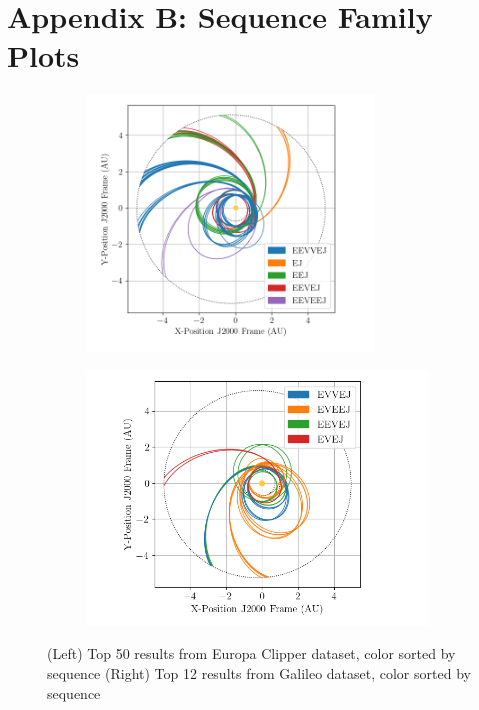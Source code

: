 \documentclass[letterpaper, preprint, paper,11pt]{AAS}	%
\begin{document}
\section{Appendix B: Sequence Family Plots}
\begin{figure}[h!]
    \begin{subfigure}{}
        \includegraphics[width=3in]{./fig/clipperFamilies.png}
        \label{fig:clipFam}
    \end{subfigure}
    \begin{subfigure}{}
        \includegraphics[width=3.55in]{./fig/galileoFamilies.png}
        \label{fig:galiFam}
    \end{subfigure}
    \caption{(Left) Top 50 results from Europa Clipper dataset, color sorted by sequence (Right) Top 12 results from Galileo dataset, color sorted by sequence}
\end{figure}
\end{document}
